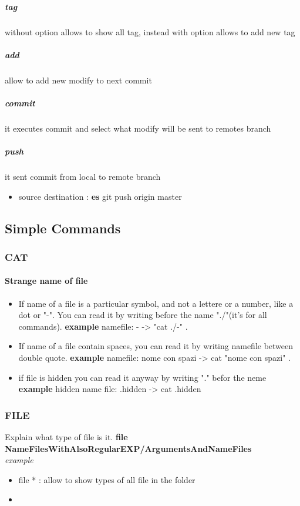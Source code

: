 \documentclass{article}
\begin{document}
                        \subparagraph{tag}
                                without option allows to show all tag, instead with option allows to add new tag 
                        \subparagraph{add}
                                allow to add new modify to next commit
                        \subparagraph{commit}
                                it executes commit and select what modify will be sent to remotes branch
                        \subparagraph{push}
                                it sent commit from local to remote branch
                                    \begin{itemize}
                                        \item source destination : \textbf{es} git push origin master
                                    \end{itemize}    
    \subsection{Simple Commands}
                \subsubsection{CAT}
                    \paragraph{Strange name of file}
                    \begin{itemize}
                        \item  If name of a file is a particular symbol, and not a lettere or a number, like a dot or "-". You can read it by writing
                        before the name "./"(it's for all commands). \textbf{example} namefile: -  -> "cat ./-" .
                        \item If name of a file contain spaces, you can read it by writing namefile between  double quote. \textbf{example } namefile: nome con spazi -> cat "nome con spazi" . 
                        \item if file is hidden you can read it anyway by writing "." befor the neme \textbf{example} hidden name file: .hidden -> cat .hidden
            
                    \end{itemize}
                \subsubsection{FILE}
                    Explain what type of file is it. \textbf{file NameFilesWithAlsoRegularEXP/ArgumentsAndNameFiles} \\
                    \textit{example}
                    \begin{itemize}
                        \item file * : allow to show types of all file in the folder
                        \item 
                    \end{itemize} 
\end{document}
